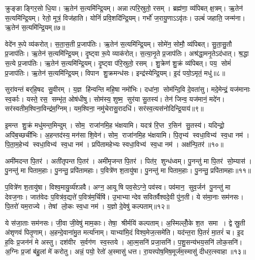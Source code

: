 क्रुङ्ङाङ्गिर॒सो धि॒या।
ऋ॒तेन॑ स॒त्यमि॑न्द्रि॒यम्।
अन्नात्परि॒स्रुतो॒ रसम्।
ब्रह्म॑णा॒ व्य॑पिबत् क्ष॒त्रम्।
ऋ॒तेन॑ स॒त्यमि॑न्द्रि॒यम्।
रेतो॒ मूत्रं॒ विज॑हाति।
योनिं॑ प्रवि॒शदि॑न्द्रि॒यम्।
गर्भो॑ ज॒रायु॒णाऽऽवृ॑तः।
उल्बं॑ जहाति॒ जन्म॑ना।
ऋ॒तेन॑ स॒त्यमि॑न्द्रि॒यम्॥७॥

वेदे॑न रू॒पे व्य॑करोत्।
स॒ता॒स॒ती प्र॒जाप॑तिः।
ऋ॒तेन॑ स॒त्यमि॑न्द्रि॒यम्।
सोमे॑न॒ सोमौ॒ व्य॑पिबत्।
सु॒ता॒सु॒तौ प्र॒जाप॑तिः।
ऋ॒तेन॑ स॒त्यमि॑न्द्रि॒यम्।
दृ॒ष्ट्वा रू॒पे व्याक॑रोत्।
स॒त्या॒नृ॒ते प्र॒जाप॑तिः।
अश्र॑द्धा॒मनृ॒तेऽद॑धात्।
श्र॒द्धा स॒त्ये प्र॒जाप॑तिः।
ऋ॒तेन॑ स॒त्यमि॑न्द्रि॒यम्।
दृ॒ष्ट्वा प॑रि॒स्रुतो॒ रसम्।
शु॒क्रेण॑ शु॒क्रं व्य॑पिबत्।
पय॒ सोमं॑ प्र॒जाप॑तिः।
ऋ॒तेन॑ स॒त्यमि॑न्द्रि॒यम्।
विपान शु॒क्रमन्ध॑सः।
इन्द्र॑स्येन्द्रि॒यम्।
इ॒दं पयो॒ऽमृतं॒ मधु॑॥८॥\anuvakamend[अ॒द्भ्यः क्षी॒रं व्य॑पिब॒ज्जन्म॑न॒र्तेन॑ स॒त्यमि॑न्द्रि॒य श्र॒द्धा स॒त्ये प्र॒जाप॑तिर॒ष्टौ च॑]

सुरा॑वन्तं बर्‌हि॒षद सु॒वीरम्।
य॒ज्ञ हि॑न्वन्ति महि॒षा नमो॑भिः।
दधा॑ना॒ सोम॑न्दि॒वि दे॒वता॑सु।
मदे॒मेन्द्रं॒ यज॑मानाः स्व॒र्काः।
यस्ते॒ रस॒ सम्भृ॑त॒ ओष॑धीषु।
सोम॑स्य॒ शुष्म॒ सुर॑या सु॒तस्य॑।
तेन॑ जिन्व॒ यज॑मानं॒ मदे॑न।
सर॑स्वतीम॒श्विना॒विन्द्र॑म॒ग्निम्।
यम॒श्विना॒ नमु॑चेरासु॒रादधि॑।
सर॑स्व॒त्यस॑नोदिन्द्रि॒याय॑॥९॥

इ॒मन्त शु॒क्रं मधु॑मन्त॒मिन्दुम्।
सोम॒ राजा॑नमि॒ह भ॑क्षयामि।
यदत्र॑ रि॒प्त र॒सिन॑ सु॒तस्य॑।
यदिन्द्रो॒ अपि॑ब॒च्छची॑भिः।
अ॒हन्तद॑स्य॒ मन॑सा शि॒वेन॑।
सोम॒ राजा॑नमि॒ह भ॑क्षयामि।
पि॒तृभ्य॑ स्वधा॒विभ्य॑ स्व॒धा नम॑।
पि॒ता॒म॒हेभ्य॑ स्वधा॒विभ्य॑ स्व॒धा नम॑।
प्रपि॑तामहेभ्यः स्वधा॒विभ्य॑ स्व॒धा नम॑।
अक्ष॑न्पि॒तर॑॥१०॥

अमी॑मदन्त पि॒तर॑।
अती॑तृपन्त पि॒तर॑।
अमी॑मृजन्त पि॒तर॑।
पित॑र॒ शुन्ध॑ध्वम्।
पु॒नन्तु॑ मा पि॒तर॑ सो॒म्यास॑।
पु॒नन्तु॑ मा पिताम॒हाः।
पु॒नन्तु॒ प्रपि॑तामहाः।
प॒वित्रे॑ण श॒तायु॑षा।
पु॒नन्तु॑ मा पिताम॒हाः।
पु॒नन्तु॒ प्रपि॑तामहाः॥११॥

प॒वित्रे॑ण श॒तायु॑षा।
विश्व॒मायु॒र्व्य॑श्ञवै।
अग्न॒ आयूषि पव॒सेऽग्ने॒ पव॑स्व।
पव॑मान॒ सुव॒र्जन॑ पु॒नन्तु॑ मा देवज॒नाः।
जात॑वेदः प॒वित्र॑व॒द्यत्ते॑ प॒वित्र॑म॒र्चिषि॑।
उ॒भाभ्यान्देव सवितर्वैश्वदे॒वी पु॑न॒ती।
ये स॑मा॒नाः सम॑नसः।
पि॒तरो॑ यम॒राज्ये।
तेषां लो॒कः स्व॒धा नम॑।
य॒ज्ञो दे॒वेषु॑ कल्पताम्॥१२॥

ये स॑जा॒ताः सम॑नसः।
जी॒वा जी॒वेषु॑ माम॒काः।
तेषा॒ श्रीर्मयि॑ कल्पताम्।
अ॒स्मिल्लोँ॒के श॒त समा।
द्वे स्रु॒ती अ॑शृणवं पितृ॒णाम्।
अ॒हन्दे॒वाना॑मु॒त मर्त्या॑नाम्।
याभ्या॑मि॒दं विश्व॒मेज॒त्समे॑ति।
यद॑न्त॒रा पि॒तरं॑ मा॒तरं॑ च।
इ॒द ह॒विः प्र॒जन॑नं मे अस्तु।
दश॑वीर स॒र्वग॑ण स्व॒स्तये।
आ॒त्म॒सनि॑ प्रजा॒सनि॑।
प॒शु॒सन्य॑भय॒सनि॑ लोक॒सनि॑।
अ॒ग्निः प्र॒जां ब॑हु॒लां मे॑ करोतु।
अन्नं॒ पयो॒ रेतो॑ अ॒स्मासु॑ धत्त।
रा॒यस्पोष॒मिष॒मूर्ज॑म॒स्मासु॑ दीधर॒त्स्वाहा॥१३॥\anuvakamend[इ॒न्द्रि॒याय॑ पि॒तर॑ श॒तायु॑षा पु॒नन्तु॑ मा पिताम॒हाः पु॒नन्तु॒ प्रपि॑तामहाः कल्पता स्व॒स्तये॒ पञ्च॑ च]

